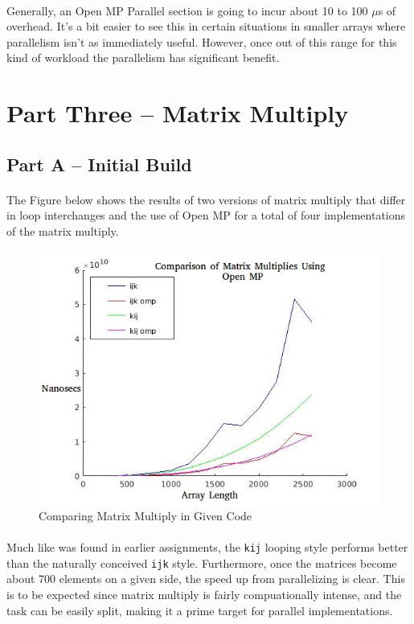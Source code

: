 \documentclass[10pt,8.5in,11in]{article}
\begin{document}
\paragraph{}
Generally, an Open MP Parallel section is going to incur about 10 to 100 $\mu$s of overhead.  It's a bit easier to see this in certain situations in smaller arrays where parallelism isn't as immediately useful.  However, once out of this range for this kind of workload the parallelism has significant benefit.

\pagebreak
\section{Part Three -- Matrix Multiply}

	\subsection{Part A -- Initial Build}
	\paragraph{}	
	The Figure below shows the results of two versions of matrix multiply that differ in loop interchanges and the use of Open MP for a total of four implementations of the matrix multiply.
	
	\begin{figure}[h!]
	\centering
	\caption{Comparing Matrix Multiply in Given Code}
	\includegraphics[scale=0.5]{part3a}
	\end{figure}
	
	\paragraph{}
	Much like was found in earlier assignments, the \texttt{kij} looping style performs better than the naturally conceived \texttt{ijk} style.  Furthermore, once the matrices become about 700 elements on a given side, the speed up from parallelizing is clear.  This is to be expected since matrix multiply is fairly compuationally intense, and the task can be easily split, making it a prime target for parallel implementations.
	
\end{document}
